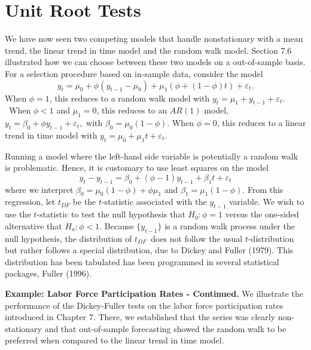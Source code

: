 \section{Unit Root Tests}

We have now seen two competing models that handle nonstationary with
a mean trend, the linear trend in time model and the random walk
model. Section 7.6 illustrated how we can choose between these two
models on a out-of-sample basis. For a selection procedure based on
in-sample data, consider the model
\begin{equation*}
y_t = \mu_0 +  \phi (y_{t-1} - \mu_0) + \mu_1 \left(  \phi +
(1-\phi) t \right) + \varepsilon_t.
\end{equation*}
When $\phi =1$, this reduces to a random walk model with $y_t=\mu
_1+y_{t-1}+\varepsilon_t.$\ When $\phi <1$ and $\mu_1=0$, this
reduces to an $AR(1)$ model, $y_t=\beta_0+\phi y_{t-1}+\varepsilon
_t, $ with $\beta_0=\mu_0\left( 1-\phi \right) .$ When $\phi =0$,
this reduces to a linear trend in time model with $y_t = \mu_0 +
\mu_1 t + \varepsilon_t.$

Running a model where the left-hand side variable is potentially a
random walk is problematic. Hence, it is customary to use least
squares on the model
\begin{equation}\label{E9:DickeyFuller1}
y_t-y_{t-1}=\beta_0+\left( \phi -1\right) y_{t-1}+\beta
_1t+\varepsilon_t
\end{equation}
where we interpret $\beta_0=\mu_0\left( 1-\phi \right) + \phi \mu_1$
and $\beta_1=\mu_1\left( 1-\phi \right).$ From this regression, let
$ t_{DF}$ be the $t$-statistic associated with the $y_{t-1}$
variable. We wish to use the $t$-statistic to test the null
hypothesis that $H_0:\phi =1$ versus the one-sided alternative that
$H_{a}:\phi <1$. Because $\{y_{t-1}\}$ is a random walk process
under the null hypothesis, the distribution of $ t_{DF}$\ does not
follow the usual $t$-distribution but rather follows a special
distribution, due to Dickey and Fuller (1979). This distribution has
been tabulated has been programmed in several statistical packages,
Fuller (1996).

\linejed{}

\textbf{Example: Labor Force Participation Rates -
Continued.} We
illustrate the performance of the Dickey-Fuller tests on the labor
force participation rates introduced in Chapter 7. There, we
established that the series was clearly non-stationary and that
out-of-sample forecasting showed the random walk to be preferred
when compared to the linear trend in time model.

